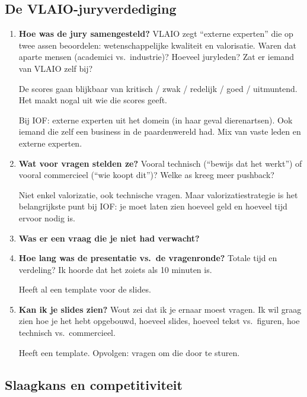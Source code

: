 \documentclass[11pt,a4paper]{article}
\newcommand{\notebox}{%
\begin{tcolorbox}[colback=notebg, colframe=noteborder, boxrule=0.5pt, arc=2pt, left=4pt, right=4pt, top=2pt, bottom=2pt]
\vspace{2.2cm}
\end{tcolorbox}
}
\newcommand{\filledbox}[1]{%
\begin{tcolorbox}[colback=notebg, colframe=noteborder, boxrule=0.5pt, arc=2pt, left=4pt, right=4pt, top=2pt, bottom=2pt]
#1
\end{tcolorbox}
}
\begin{document}
\subsection{De VLAIO-juryverdediging}

\begin{enumerate}

\item \textbf{Hoe was de jury samengesteld?} VLAIO zegt ``externe experten'' die op twee assen beoordelen: wetenschappelijke kwaliteit en valorisatie. Waren dat aparte mensen (academici vs.\ industrie)? Hoeveel juryleden? Zat er iemand van VLAIO zelf bij?

De scores gaan blijkbaar van kritisch / zwak / redelijk / goed / uitmuntend. Het maakt nogal uit wie die scores geeft.

\filledbox{Bij IOF: externe experten uit het domein (in haar geval dierenartsen). Ook iemand die zelf een business in de paardenwereld had. Mix van vaste leden en externe experten.}

\item \textbf{Wat voor vragen stelden ze?} Vooral technisch (``bewijs dat het werkt'') of vooral commercieel (``wie koopt dit'')? Welke as kreeg meer pushback?

\filledbox{Niet enkel valorizatie, ook technische vragen. Maar valorizatiestrategie is het belangrijkste punt bij IOF: je moet laten zien hoeveel geld en hoeveel tijd ervoor nodig is.}

\item \textbf{Was er een vraag die je niet had verwacht?}

\notebox

\item \textbf{Hoe lang was de presentatie vs.\ de vragenronde?} Totale tijd en verdeling? Ik hoorde dat het zoiets als 10 minuten is.

\filledbox{Heeft al een template voor de slides.}

\item \textbf{Kan ik je slides zien?} Wout zei dat ik je ernaar moest vragen. Ik wil graag zien hoe je het hebt opgebouwd, hoeveel slides, hoeveel tekst vs.\ figuren, hoe technisch vs.\ commercieel.

\filledbox{Heeft een template. Opvolgen: vragen om die door te sturen.}

\end{enumerate}

\subsection{Slaagkans en competitiviteit}
\end{document}
